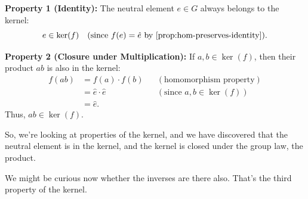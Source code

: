 \begin{content}
\textbf{Property 1 (Identity):} The neutral element $e \in G$ always belongs to the kernel:
\begin{equation}\label{eq:ker-prop-1}
e \in \operatorname{ker}(f) \quad (\text{since } f(e) = \hat{e} \text{ by \cref{prop:hom-preserves-identity}}).
\end{equation}

\textbf{Property 2 (Closure under Multiplication):} If $a, b \in \operatorname{ker}(f)$, then their product $ab$ is also in the kernel:
\begin{align}
f(ab) &= f(a) \cdot f(b) && (\text{homomorphism property}) \nonumber \\
&= \hat{e} \cdot \hat{e} && (\text{since } a, b \in \operatorname{ker}(f)) \nonumber \\
&= \hat{e}. \label{eq:ker-prop-2}
\end{align}
Thus, $ab \in \operatorname{ker}(f)$.
\end{content}

\begin{speech}[00:22:06 - 00:23:03]
So, we're looking at properties of the kernel, and we have discovered that the neutral element is in the kernel, and the kernel is closed under the group law, the product.

We might be curious now whether the inverses are there also. That's the third property of the kernel.
\end{speech}

